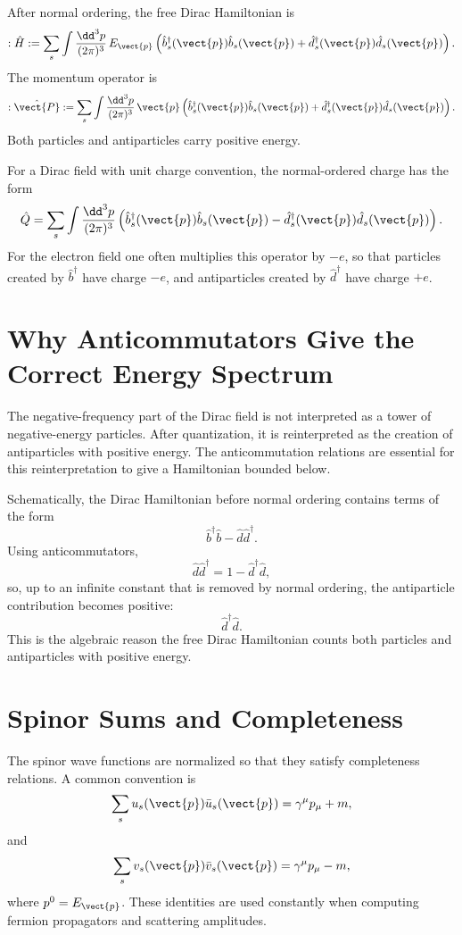 After normal ordering, the free Dirac Hamiltonian is
\[
    :\hat H:
    = \sum_s\int\frac{\dd^3p}{(2\pi)^3}\,
      E_{\vect{p}}
      \left(
          \hat b_s^\dagger(\vect{p})\hat b_s(\vect{p})
          +
          \hat d_s^\dagger(\vect{p})\hat d_s(\vect{p})
      \right).
\]
The momentum operator is
\[
    :\hat{\vect{P}}:
    = \sum_s\int\frac{\dd^3p}{(2\pi)^3}\,
      \vect{p}
      \left(
          \hat b_s^\dagger(\vect{p})\hat b_s(\vect{p})
          +
          \hat d_s^\dagger(\vect{p})\hat d_s(\vect{p})
      \right).
\]
Both particles and antiparticles carry positive energy.

For a Dirac field with unit charge convention, the normal-ordered charge has the
form
\[
    \hat Q
    = \sum_s\int\frac{\dd^3p}{(2\pi)^3}
      \left(
          \hat b_s^\dagger(\vect{p})\hat b_s(\vect{p})
          -
          \hat d_s^\dagger(\vect{p})\hat d_s(\vect{p})
      \right).
\]
For the electron field one often multiplies this operator by \(-e\), so that
particles created by \(\hat b^\dagger\) have charge \(-e\), and antiparticles
created by \(\hat d^\dagger\) have charge \(+e\).

\section{Why Anticommutators Give the Correct Energy Spectrum}

The negative-frequency part of the Dirac field is not interpreted as a tower of
negative-energy particles. After quantization, it is reinterpreted as the
creation of antiparticles with positive energy. The anticommutation relations are
essential for this reinterpretation to give a Hamiltonian bounded below.

Schematically, the Dirac Hamiltonian before normal ordering contains terms of
the form
\[
    \hat b^\dagger\hat b
    - \hat d\hat d^\dagger.
\]
Using anticommutators,
\[
    \hat d\hat d^\dagger
    = 1-\hat d^\dagger\hat d,
\]
so, up to an infinite constant that is removed by normal ordering, the
antiparticle contribution becomes positive:
\[
    \hat d^\dagger\hat d.
\]
This is the algebraic reason the free Dirac Hamiltonian counts both particles
and antiparticles with positive energy.

\section{Spinor Sums and Completeness}

The spinor wave functions are normalized so that they satisfy completeness
relations. A common convention is
\[
    \sum_s u_s(\vect{p})\bar u_s(\vect{p})
    = \gamma^\mu p_\mu + m,
\]
and
\[
    \sum_s v_s(\vect{p})\bar v_s(\vect{p})
    = \gamma^\mu p_\mu - m,
\]
where \(p^0=E_{\vect{p}}\). These identities are used constantly when computing
fermion propagators and scattering amplitudes.

